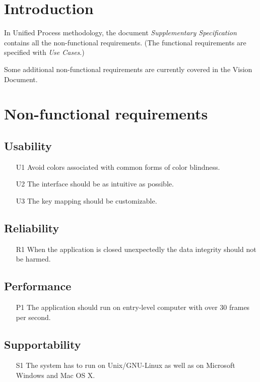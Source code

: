 \documentclass[fontsize=12pt,
               paper=a4,
               twoside=false,
               parskip=half,
               ]{scrartcl}
\begin{document}
\newcommand{\doctitle}{Supplementary Specification}


\tableofcontents

\section{Introduction}
In Unified Process methodology, the document \emph{Supplementary Specification} contains all the non-functional requirements. (The functional requirements are specified with \emph{Use Cases}.)

Some additional non-functional requirements are currently covered in the Vision Document.

\section{Non-functional requirements}

\subsection{Usability}
\begin{itemize}
	\item[U1] Avoid colors associated with common forms of color blindness.
	\item[U2] The interface should be as intuitive as possible.
	\item[U3] The key mapping should be customizable.
\end{itemize}

\subsection{Reliability}
\begin{itemize}
	\item[R1] When the application is closed unexpectedly the data integrity should not be harmed.
\end{itemize}

\subsection{Performance}
\begin{itemize}
	\item[P1] The application should run on entry-level computer with over 30 frames per second.
\end{itemize}

\subsection{Supportability}
\begin{itemize}
	\item[S1] The system has to run on Unix/GNU-Linux as well as on Microsoft Windows and Mac OS X.	
\end{itemize}
\end{document}
